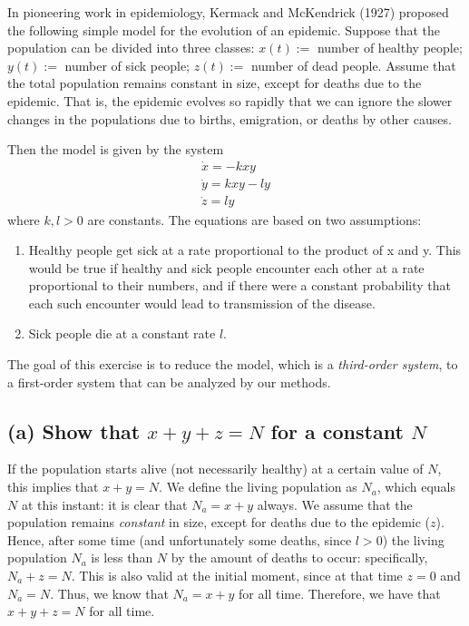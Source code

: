\documentclass[draft]{agujournal2019}
\begin{document}
In pioneering work in epidemiology, Kermack and McKendrick (1927) proposed the following simple model for the evolution of an epidemic. Suppose that the population can be divided into three classes: $x(t):=$ number of healthy people; $y(t):=$ number of sick people; $z(t):=$ number of dead people. Assume that the total population remains constant in size, except for deaths due to the epidemic. That is, the epidemic evolves so rapidly that we can ignore the slower changes in the populations due to births, emigration, or
deaths by other causes. 
\par
Then the model is given by the system
\begin{align*}
    \dot x = -kxy \\ 
    \dot y = kxy - ly\\
    \dot z = ly
\end{align*}
where $k,l>0$ are constants. The equations are based on two assumptions:
\begin{enumerate}
    \item Healthy people get sick at a rate proportional to the product of x and y. This would be true if healthy and sick people encounter each other at a rate proportional to their numbers, and if there were a constant probability that each such encounter would lead to transmission of the disease.
    \item Sick people die at a constant rate $l$.
\end{enumerate}
\par
The goal of this exercise is to reduce the model, which is a \emph{third-order system}, to a first-order system that can be analyzed by our methods.


\subsection{(a) Show that $x+y+z=N$ for a constant $N$}
\label{ssec:p2a}

If the population starts alive (not necessarily healthy) at a certain value of $N$, this implies that $x+y=N$. We define the living population as $N_a$, which equals $N$ at this instant: it is clear that $N_a=x+y$ always. We assume that the population remains \emph{constant} in size, except for deaths due to the epidemic ($z$). Hence, after some time (and unfortunately some deaths, since $l>0$) the living population $N_a$ is less than $N$ by the amount of deaths to occur: specifically, $N_a + z = N$. This is also valid at the initial moment, since at that time $z=0$ and $N_a=N$. Thus, we know that $N_a=x+y$ for all time. Therefore, we have that $x+y+z=N$ for all time.
\end{document}
